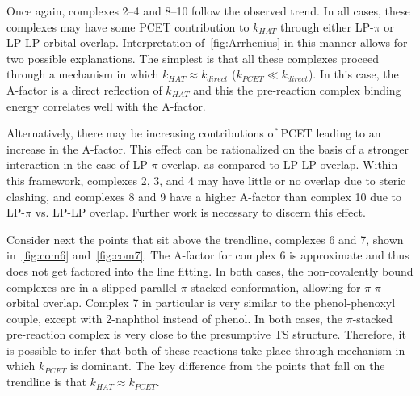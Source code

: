 \begin{doublespace}
Once again, complexes 2--4 and 8--10 follow the observed trend. In all cases,
these complexes may have some PCET contribution to $k_{HAT}$ through either
LP-$\pi$ or LP-LP orbital overlap. Interpretation of~\ref{fig:Arrhenius} in this
manner allows for two possible explanations. The simplest is that all these
complexes proceed through a mechanism in which $k_{HAT} \approx k_{direct}$
($k_{PCET} \ll k_{direct}$). In this case, the A-factor is a direct reflection
of $k_{HAT}$ and this the pre-reaction complex binding energy correlates well
with the A-factor.

Alternatively, there may be increasing contributions of PCET leading to an
increase in the A-factor. This effect can be rationalized on the basis of a
stronger interaction in the case of LP-$\pi$ overlap, as compared to LP-LP
overlap. Within this framework, complexes 2, 3, and 4 may have little or no
overlap due to steric clashing, and complexes 8 and 9 have a higher A-factor
than complex 10 due to LP-$\pi$ vs. LP-LP overlap. Further work is necessary to
discern this effect.

Consider next the points that sit above the trendline, complexes 6 and 7, shown
in~\ref{fig:com6} and~\ref{fig:com7}. The A-factor for complex 6 is approximate
and thus does not get factored into the line fitting. In both cases, the
non-covalently bound complexes are in a slipped-parallel $\pi$-stacked
conformation, allowing for $\pi$-$\pi$ orbital overlap.  Complex 7 in particular
is very similar to the phenol-phenoxyl couple, except with 2-naphthol instead of
phenol. In both cases, the $\pi$-stacked pre-reaction complex is very close to
the presumptive TS structure. Therefore, it is possible to infer that both of
these reactions take place through mechanism in which $k_{PCET}$ is dominant.
The key difference from the points that fall on the trendline is that $k_{HAT}
\approx k_{PCET}$.


\end{doublespace}
